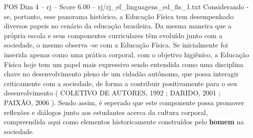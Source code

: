 \begin{textsample}{POS Dim 4 – rj – Score 6.00 – rj/rj\_ef\_linguagens\_ed\_fis\_1.txt}
Considerando -se, portanto, esse panorama histórico, a Educação Física tem desempenhado diversos papeis no cenário da educação brasileira.
Da mesma maneira que a própria escola e seus componentes curriculares têm evoluído junto com a sociedade, o mesmo observa -se com a Educação Física.
Se inicialmente foi inserida apenas como uma prática corporal, com o objetivo higiênico, a Educação Física hoje tem um papel mais expressivo sendo entendida como uma disciplina chave no desenvolvimento pleno de um cidadão autônomo, que possa interagir criticamente com a sociedade, de forma a contribuir positivamente para o seu desenvolvimento ( COLETIVO DE AUTORES, 1992 ; DARIDO, 2001 ; PAIXÃO, 2006 ).
Sendo assim, é esperado que este componente possa promover reflexões e diálogos junto aos estudantes acerca da cultura corporal, compreendida aqui como elementos historicamente construídos pelo \textbf{homem} na sociedade.

\end{textsample}
